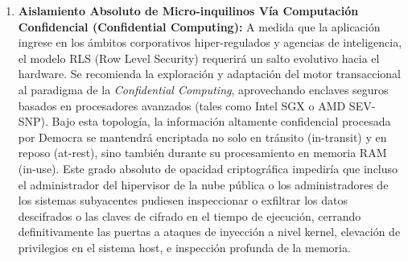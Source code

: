 \begin{enumerate}
    \item \textbf{Aislamiento Absoluto de Micro-inquilinos Vía Computación Confidencial (Confidential Computing):}
    A medida que la aplicación ingrese en los ámbitos corporativos hiper-regulados y agencias de inteligencia, el modelo RLS (Row Level Security) requerirá un salto evolutivo hacia el hardware. Se recomienda la exploración y adaptación del motor transaccional al paradigma de la \textit{Confidential Computing}, aprovechando enclaves seguros basados en procesadores avanzados (tales como Intel SGX o AMD SEV-SNP). Bajo esta topología, la información altamente confidencial procesada por Democra se mantendrá encriptada no solo en tránsito (in-transit) y en reposo (at-rest), sino también durante su procesamiento en memoria RAM (in-use). Este grado absoluto de opacidad criptográfica impediría que incluso el administrador del hipervisor de la nube pública o los administradores de los sistemas subyacentes pudiesen inspeccionar o exfiltrar los datos descifrados o las claves de cifrado en el tiempo de ejecución, cerrando definitivamente las puertas a ataques de inyección a nivel kernel, elevación de privilegios en el sistema host, e inspección profunda de la memoria.
\end{enumerate}
